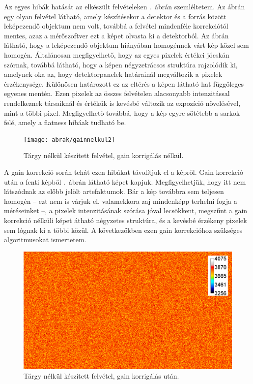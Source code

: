 \documentclass[a4paper,12pt]{article}
\begin{document}
Az egyes hibák hatását az elkészült felvételeken .~ábrán szemléltetem. Az ábrán egy olyan felvétel látható, amely készítésekor a detektor és a forrás között leképezendő objektum nem volt, továbbá a felvétel mindenféle korrekciótól mentes, azaz a mérőszoftver ezt a képet olvasta ki a detektorból. Az ábrán látható, hogy a leképezendő objektum hiányában homogénnek várt kép közel sem homogén. Általánosan megfigyelhető, hogy az egyes pixelek értékei jócskán szórnak, továbbá látható, hogy a képen négyzetrácsos struktúra rajzolódik ki, amelynek oka  az, hogy detektorpanelek határainál megváltozik a pixelek érzékenysége. Különösen határozott ez az eltérés a képen látható hat függőleges egyenes mentén. Ezen pixelek az összes felvételen alacsonyabb intenzitással rendelkeznek társaiknál és értékük is kevésbé változik az expozíció növelésével, mint a többi pixel. Megfigyelhető továbbá, hogy a kép egyre sötétebb a sarkok felé, amely a flatness hibáak tudható be.

\begin{figure}[htbp]
\center
\texttt{[image: abrak/gainnelkul2]}
\caption{Tárgy nélkül készített felvétel, gain korrigálás nélkül.}
\label{fig:gainnelkul}
\end{figure}

A gain korrekció során tehát ezen hibákat távolítjuk el a képről. Gain korrekció után a fenti képből .~ábrán látható képet kapjuk. Megfigyelhetjük, hogy itt nem látszódnak az előbb jelölt artefaktumok. Bár a kép továbbra sem teljesen homogén -- ezt nem is várjuk el, valamekkora zaj mindenképp terhelni fogja a méréseinket --, a pixelek intenzitásának szórása jóval lecsökkent, megszűnt a gain korrekció nélküli képet átható négyzetes struktúra, és a kevésbé érzékeny pixelek sem lógnak ki a többi közül. A következőkben ezen  gain korrekcióhoz szükséges algoritmusokat ismertetem.

\begin{figure}[htbp]
\center
\includegraphics[width=1.0\textwidth]{abrak/gainnel}
\caption{Tárgy nélkül készített felvétel, gain korrigálás után.}
\label{fig:gainnel}
\end{figure}
\end{document}
